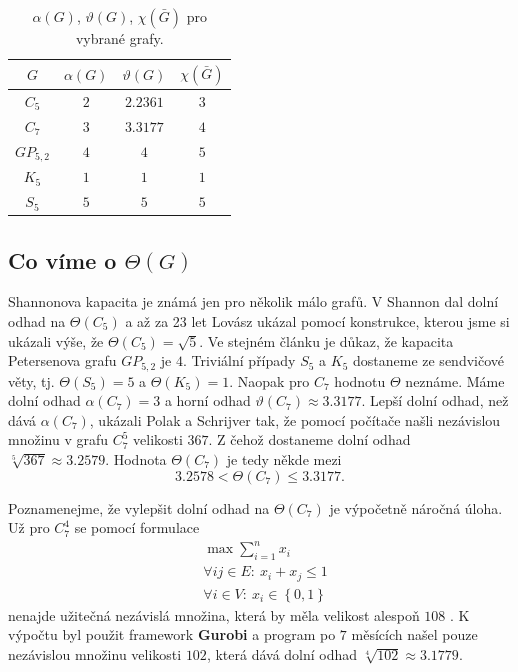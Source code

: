 \begin{table}[h!]
    \centering
    \begin{tabular}{ c | c c c }
        $G$        & $\alpha(G)$ & $\vartheta(G)$ & $\chi(\bar{G})$ \\
        \hline
        $C_5$      & $2$         & $2.2361$       & $3$ \\  
        $C_7$      & $3$         & $3.3177$       & $4$ \\
        $GP_{5,2}$ & $4$         & $4$            & $5$ \\
        $K_5$      & $1$         & $1$            & $1$ \\
        $S_5$      & $5$         & $5$            & $5$
    \end{tabular}
    \caption{$\alpha(G)$, $\vartheta(G)$, $\chi(\bar{G})$ pro vybrané grafy.}
    \label{tab:sandwitch}
\end{table}

\subsection*{Co víme o $\Theta(G)$}

Shannonova kapacita je známá jen pro několik málo grafů. V \cite{shannon} Shannon dal dolní odhad na $\Theta(C_5)$ a až za 23 let Lovász ukázal pomocí konstrukce, kterou jsme si ukázali výše, že $\Theta(C_5) = \sqrt{5}$. Ve stejném článku je důkaz, že kapacita Petersenova grafu $GP_{5,2}$ je $4$. Triviální případy $S_5$ a $K_5$ dostaneme ze sendvičové věty, tj. $\Theta(S_5) = 5$ a $\Theta(K_5) = 1$. Naopak pro $C_7$ hodnotu $\Theta$ neznáme. Máme dolní odhad $\alpha(C_7) = 3$ a horní odhad $\vartheta(C_7) \approx 3.3177$. Lepší dolní odhad, než dává $\alpha(C_7)$, ukázali Polak a Schrijver \cite{shannon-capacity-lower-bound-on-c7} tak, že pomocí počítače našli nezávislou množinu v grafu $C_7^5$ velikosti $367$. Z čehož dostaneme dolní odhad $\sqrt[5]{367} \approx 3.2579$. Hodnota $\Theta(C_7)$ je tedy někde mezi
$$
    3.2578 < \Theta(C_7) \leq 3.3177.
$$

Poznamenejme, že vylepšit dolní odhad na $\Theta(C_7)$ je výpočetně náročná úloha. Už pro $C_7^4$ se pomocí formulace
\begin{equation*}
    \begin{split}
        &\max \sum_{i=1}^n x_i \\
        &\forall ij \in E:\ x_i + x_j \leq 1 \\
        &\forall i \in V:\ x_i \in \left\{ 0, 1 \right\}
    \end{split}
\end{equation*}
nenajde užitečná nezávislá množina, která by měla velikost alespoň $108$ \cite{shannon-capacity-lower-bound-on-c7-worst}. K výpočtu byl použit framework \textbf{Gurobi} a program po $7$ měsících našel pouze nezávislou množinu velikosti $102$, která dává dolní odhad $\sqrt[4]{102} \approx 3.1779$.


